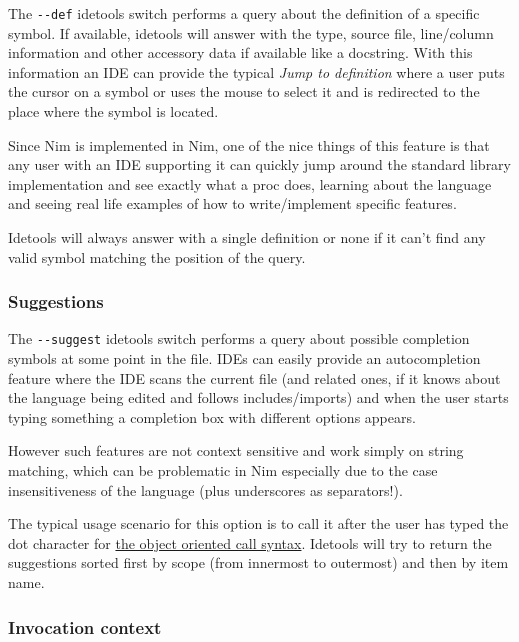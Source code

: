 The \texttt{-\/-def} idetools switch performs a query about the
definition of a specific symbol. If available, idetools will answer with
the type, source file, line/column information and other accessory data
if available like a docstring. With this information an IDE can provide
the typical \emph{Jump to definition} where a user puts the cursor on a
symbol or uses the mouse to select it and is redirected to the place
where the symbol is located.

Since Nim is implemented in Nim, one of the nice things of this feature
is that any user with an IDE supporting it can quickly jump around the
standard library implementation and see exactly what a proc does,
learning about the language and seeing real life examples of how to
write/implement specific features.

Idetools will always answer with a single definition or none if it can't
find any valid symbol matching the position of the query.

\hypertarget{suggestions}{%
\subsubsection{Suggestions}\label{suggestions}}

The \texttt{-\/-suggest} idetools switch performs a query about possible
completion symbols at some point in the file. IDEs can easily provide an
autocompletion feature where the IDE scans the current file (and related
ones, if it knows about the language being edited and follows
includes/imports) and when the user starts typing something a completion
box with different options appears.

However such features are not context sensitive and work simply on
string matching, which can be problematic in Nim especially due to the
case insensitiveness of the language (plus underscores as separators!).

The typical usage scenario for this option is to call it after the user
has typed the dot character for
\href{tut2.html\#object-oriented-programming-method-call-syntax}{the
object oriented call syntax}. Idetools will try to return the
suggestions sorted first by scope (from innermost to outermost) and then
by item name.

\hypertarget{invocation-context}{%
\subsubsection{Invocation context}\label{invocation-context}}

